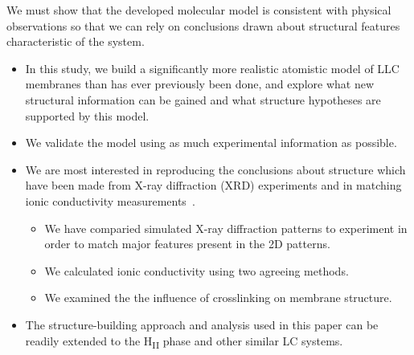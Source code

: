 \documentclass{article}
\begin{document}
  We must show that the developed molecular model is consistent with
  physical observations so that we can rely on conclusions drawn about
  structural features characteristic of the system.
  \begin{itemize}
    \item In this study, we build a significantly more realistic atomistic model of LLC membranes 
    than has ever previously been done, and explore what new structural information can be gained
    and what structure hypotheses are supported by this model.

    \item We validate the model using as much experimental information as possible.
    \item We are %
    most interested in reproducing the 
    conclusions about structure which have been made from X-ray diffraction (XRD) 
    experiments and in matching ionic conductivity measurements~\cite{feng_thin_2016}.
    \begin{itemize}
	    \item We have comparied simulated X-ray diffraction patterns to experiment in 
	    order to match major features present in the 2D patterns.
	    \item We calculated ionic conductivity using two agreeing methods.
	    \item We examined the the influence of crosslinking on membrane structure.
    \end{itemize}
    \item The structure-building approach and analysis used in this paper can be readily extended
    to the H\textsubscript{II} phase and other similar LC systems.
  \end{itemize}
  
\end{document}
